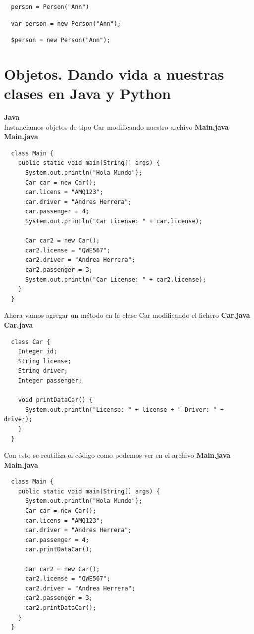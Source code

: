 \documentclass{article}
\begin{document}
\begin{verbatim}
  person = Person("Ann")
\end{verbatim}


\begin{verbatim}
  var person = new Person("Ann");
\end{verbatim}

\begin{verbatim}
  $person = new Person("Ann");
\end{verbatim}


\section{Objetos. Dando vida a nuestras clases en Java y Python}%

\textbf{Java}\\
Instanciamos objetos de tipo Car modificando nuestro archivo \textbf{Main.java}\\

\textbf{Main.java}
\begin{verbatim}
  class Main {
    public static void main(String[] args) {
      System.out.println("Hola Mundo");
      Car car = new Car();
      car.licens = "AMQ123";
      car.driver = "Andres Herrera";
      car.passenger = 4;
      System.out.println("Car License: " + car.license);

      Car car2 = new Car();
      car2.license = "QWE567";
      car2.driver = "Andrea Herrera";
      car2.passenger = 3;
      System.out.println("Car License: " + car2.license);
    }
  }
\end{verbatim}

Ahora vamos agregar un método en la clase Car modificando el fichero \textbf{Car.java}\\

\textbf{Car.java}
\begin{verbatim}
  class Car {
    Integer id;
    String license;
    String driver;
    Integer passenger;

    void printDataCar() {
      System.out.println("License: " + license + " Driver: " + driver);
    }
  }
\end{verbatim}


Con esto se reutiliza el código como podemos ver en el archivo \textbf{Main.java}\\

\textbf{Main.java}
\begin{verbatim}
  class Main {
    public static void main(String[] args) {
      System.out.println("Hola Mundo");
      Car car = new Car();
      car.licens = "AMQ123";
      car.driver = "Andres Herrera";
      car.passenger = 4;
      car.printDataCar();

      Car car2 = new Car();
      car2.license = "QWE567";
      car2.driver = "Andrea Herrera";
      car2.passenger = 3;
      car2.printDataCar();
    }
  }
\end{verbatim}
\end{document}
